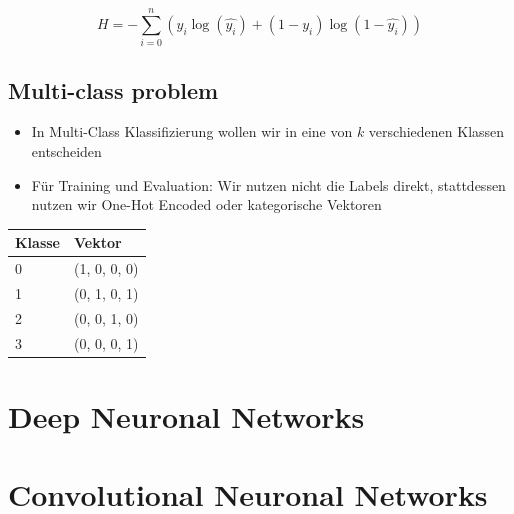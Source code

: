 \documentclass[a4paper]{article}
\begin{document}
		$$ H = - \sum_{i=0}^{n} ( y_{i} \log ( \hat{y_{i}} ) + ( 1 - y_{i} ) \log ( 1 - \hat{y_{i}} ) ) $$
		
		\subsection{Multi-class problem}
		
		\begin{itemize}
			\item In Multi-Class Klassifizierung wollen wir in eine von $k$ verschiedenen Klassen entscheiden
			\item Für Training und Evaluation: Wir nutzen nicht die Labels direkt, stattdessen nutzen wir One-Hot Encoded oder kategorische Vektoren
		\end{itemize}
	
		\begin{table}[htb!]
			\centering
			\begin{tabular}{|l|l|}
				\hline
				\textbf{Klasse} & \textbf{Vektor} \\ \hline \hline
				0               & (1, 0, 0, 0)    \\ \hline
				1               & (0, 1, 0, 1)    \\ \hline
				2               & (0, 0, 1, 0)    \\ \hline
				3               & (0, 0, 0, 1)    \\ \hline
			\end{tabular}
		\end{table}
		
		
		
	
	\section{Deep Neuronal Networks}
	
	
	
	\section{Convolutional Neuronal Networks}
	
	
\end{document}
